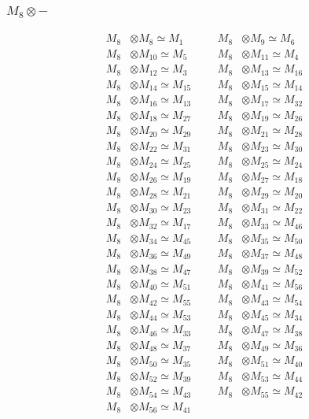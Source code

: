 \subsubsection{$ M_{8}\otimes -$}
\begin{align*}
M_{8} &\otimes M_{8} \simeq M_{1} &&& M_{8} &\otimes M_{9} \simeq M_{6}\\
M_{8} &\otimes M_{10} \simeq M_{5} &&& M_{8} &\otimes M_{11} \simeq M_{4}\\
M_{8} &\otimes M_{12} \simeq M_{3} &&& M_{8} &\otimes M_{13} \simeq M_{16}\\
M_{8} &\otimes M_{14} \simeq M_{15} &&& M_{8} &\otimes M_{15} \simeq M_{14}\\
M_{8} &\otimes M_{16} \simeq M_{13} &&& M_{8} &\otimes M_{17} \simeq M_{32}\\
M_{8} &\otimes M_{18} \simeq M_{27} &&& M_{8} &\otimes M_{19} \simeq M_{26}\\
M_{8} &\otimes M_{20} \simeq M_{29} &&& M_{8} &\otimes M_{21} \simeq M_{28}\\
M_{8} &\otimes M_{22} \simeq M_{31} &&& M_{8} &\otimes M_{23} \simeq M_{30}\\
M_{8} &\otimes M_{24} \simeq M_{25} &&& M_{8} &\otimes M_{25} \simeq M_{24}\\
M_{8} &\otimes M_{26} \simeq M_{19} &&& M_{8} &\otimes M_{27} \simeq M_{18}\\
M_{8} &\otimes M_{28} \simeq M_{21} &&& M_{8} &\otimes M_{29} \simeq M_{20}\\
M_{8} &\otimes M_{30} \simeq M_{23} &&& M_{8} &\otimes M_{31} \simeq M_{22}\\
M_{8} &\otimes M_{32} \simeq M_{17} &&& M_{8} &\otimes M_{33} \simeq M_{46}\\
M_{8} &\otimes M_{34} \simeq M_{45} &&& M_{8} &\otimes M_{35} \simeq M_{50}\\
M_{8} &\otimes M_{36} \simeq M_{49} &&& M_{8} &\otimes M_{37} \simeq M_{48}\\
M_{8} &\otimes M_{38} \simeq M_{47} &&& M_{8} &\otimes M_{39} \simeq M_{52}\\
M_{8} &\otimes M_{40} \simeq M_{51} &&& M_{8} &\otimes M_{41} \simeq M_{56}\\
M_{8} &\otimes M_{42} \simeq M_{55} &&& M_{8} &\otimes M_{43} \simeq M_{54}\\
M_{8} &\otimes M_{44} \simeq M_{53} &&& M_{8} &\otimes M_{45} \simeq M_{34}\\
M_{8} &\otimes M_{46} \simeq M_{33} &&& M_{8} &\otimes M_{47} \simeq M_{38}\\
M_{8} &\otimes M_{48} \simeq M_{37} &&& M_{8} &\otimes M_{49} \simeq M_{36}\\
M_{8} &\otimes M_{50} \simeq M_{35} &&& M_{8} &\otimes M_{51} \simeq M_{40}\\
M_{8} &\otimes M_{52} \simeq M_{39} &&& M_{8} &\otimes M_{53} \simeq M_{44}\\
M_{8} &\otimes M_{54} \simeq M_{43} &&& M_{8} &\otimes M_{55} \simeq M_{42}\\
M_{8} &\otimes M_{56} \simeq M_{41}
\end{align*}

